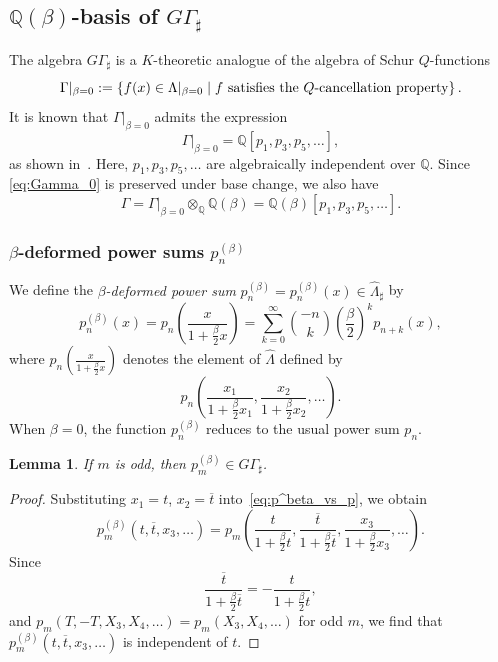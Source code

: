 \documentclass[dvipdfmx]{amsart}
\newtheorem{lemma}[thm]{Lemma}
\theoremstyle{definition}
\theoremstyle{remark}
\begin{document}
\subsection{\( \mathbb{Q}(\beta) \)-basis of \( G\Gamma_\sharp \)}

The algebra \( G\Gamma_\sharp \) is a \( K \)-theoretic analogue of the algebra of Schur \( Q \)-functions
\[
\Gamma|_{\beta=0} := \left\{ f(x) \in \Lambda|_{\beta=0} \;\middle|\; 
f \text{ satisfies the \( Q \)-cancellation property} \right\}.
\]
It is known that $\Gamma|_{\beta=0}$ admits the expression
\begin{equation}\label{eq:Gamma_0}
\Gamma|_{\beta=0} = \mathbb{Q}[p_1, p_3, p_5, \dots],
\end{equation}
as shown in~\cite[\S III-8]{macbook}. 
Here, \( p_1, p_3, p_5, \dots \) are algebraically independent over \( \mathbb{Q} \). Since \eqref{eq:Gamma_0} is preserved under base change, we also have
\begin{equation}\label{eq:Gamma_beta}
\Gamma = \Gamma|_{\beta=0} \otimes_{\mathbb{Q}} \mathbb{Q}(\beta) = \mathbb{Q}(\beta)[p_1, p_3, p_5, \dots].
\end{equation}

\subsubsection{\( \beta \)-deformed power sums \( p_n^{(\beta)} \)}

We define the \textit{\( \beta \)-deformed power sum} \( p_n^{(\beta)} = p_n^{(\beta)}(x) \in \widehat{\Lambda}_\sharp \) by
\begin{equation}\label{eq:p^beta_vs_p}
p^{(\beta)}_n(x) = p_n\left( \frac{x}{1 + \frac{\beta}{2}x} \right)
= \sum_{k=0}^\infty \binom{-n}{k} \left( \frac{\beta}{2} \right)^k p_{n+k}(x),
\end{equation}
where \( p_n\left( \frac{x}{1 + \frac{\beta}{2}x} \right) \) denotes the element of \( \widehat{\Lambda} \) defined by
\[
p_n\left( \frac{x_1}{1 + \frac{\beta}{2}x_1}, \frac{x_2}{1 + \frac{\beta}{2}x_2}, \dots \right).
\]
When \( \beta = 0 \), the function \( p^{(\beta)}_n \) reduces to the usual power sum \( p_n \).

\begin{lemma}
If \( m \) is odd, then \( p_m^{(\beta)} \in G\Gamma_\sharp \).
\end{lemma}

\begin{proof}
Substituting \( x_1 = t \), \( x_2 = \overline{t} \) into~\eqref{eq:p^beta_vs_p}, we obtain
\[
p_m^{(\beta)}(t, \overline{t}, x_3, \dots) = p_m\left( 
\frac{t}{1 + \frac{\beta}{2}t},
\frac{\overline{t}}{1 + \frac{\beta}{2}\overline{t}},
\frac{x_3}{1 + \frac{\beta}{2}x_3}, \dots
\right).
\]
Since
\[
\frac{\overline{t}}{1 + \frac{\beta}{2} \overline{t}} = - \frac{t}{1 + \frac{\beta}{2} t},
\]
and \( p_m(T, -T, X_3, X_4, \dots) = p_m(X_3, X_4, \dots) \) for odd \( m \), we find that \( p_m^{(\beta)}(t, \overline{t}, x_3, \dots) \) is independent of \( t \).
\end{proof}
\end{document}
